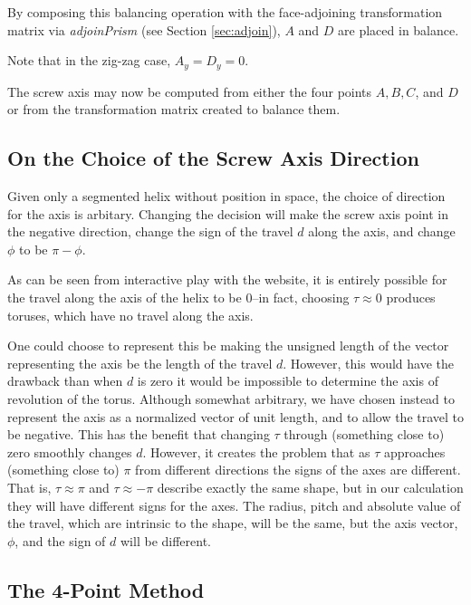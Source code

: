 \documentclass[11pt]{article}
\newenvironment{sketch}{%
  \renewcommand{\proofname}{Proof Sketch}\proof}{\endproof}
\begin{document}
{\begin{sketch}
By composing this balancing operation with the face-adjoining transformation
matrix via {\em adjoinPrism} (see Section \ref{sec:adjoin}), $A$ and $D$ are placed in balance.

Note that in the zig-zag case, $A_y = D_y = 0$.

\end{sketch}

The screw axis may now
be computed from either the four points $A,B,C$, and $D$ or from the transformation
matrix created to balance them.

\subsection{On the Choice of the Screw Axis Direction}

Given only a segmented helix without position in space,
the choice of
direction for the axis is arbitary.
Changing the decision will make the screw axis point in the negative direction,
change the sign of the travel $d$ along the axis, and change $\phi$ to be $\pi - \phi$.

As can be seen from interactive play with the website\cite{segmentedhelixinteractive},
it is entirely possible for the travel along
the axis of the helix to be $0$--in fact, choosing $\tau \approx 0$ produces toruses, which have no
travel along the axis.

One could choose to represent this be making the unsigned length of the vector
representing the axis be the length of the
travel $d$.
However, this would have the drawback than when $d$ is zero it would be impossible to determine
the axis of revolution of the torus.
Although somewhat arbitrary, we have chosen instead to represent the
axis as a normalized vector of unit length,
and to allow the travel to be negative. This has the benefit that
changing $\tau$ through (something close to)
zero smoothly changes $d$. However, it creates the problem that as $\tau$ approaches
(something close to) $\pi$ from different directions the signs of the axes are different.
That is, $\tau \approx \pi$ and $\tau \approx -\pi$ describe exactly
the same shape, but in our calculation
they will have different signs for the axes. The radius, pitch and
absolute value of the travel,
which are intrinsic to the shape, will be the same,
but the axis vector, $\phi$, and the sign of $d$ will be different.

\subsection{The 4-Point Method}

}
\end{document}

